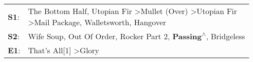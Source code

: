 \begin{supertabular}{p{0.03\textwidth}p{0.92\textwidth}}
 \textbf{S1}:  &  The Bottom Half\textsuperscript{}, \enspace Utopian Fir\textsuperscript{} \textgreater \enspace Mullet (Over)\textsuperscript{} \textgreater \enspace Utopian Fir\textsuperscript{} \textgreater \enspace Mail Package\textsuperscript{}, \enspace Walletsworth\textsuperscript{}, \enspace Hangover\textsuperscript{}  \enspace  \\
 \textbf{S2}:  &                                                                                                              Wife Soup\textsuperscript{}, \enspace Out Of Order\textsuperscript{}, \enspace Rocker Part 2\textsuperscript{}, \enspace \textbf{Passing\textsuperscript{$\wedge$}}, \enspace Bridgeless\textsuperscript{}  \enspace  \\
 \textbf{E1}:  &                                                                                                                                                                                                                                           That's All[1]\textsuperscript{} \textgreater \enspace Glory\textsuperscript{}  \enspace  \\
\end{supertabular}
